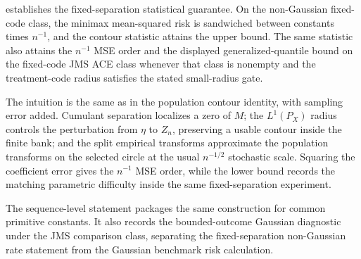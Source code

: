 \documentclass[11pt]{article}
\begin{document}
 establishes the fixed-separation statistical guarantee. On the non-Gaussian fixed-code class, the minimax mean-squared risk is sandwiched between constants times \(n^{-1}\), and the contour statistic attains the upper bound. The same statistic also attains the \(n^{-1}\) MSE order and the displayed generalized-quantile bound on the fixed-code JMS ACE class whenever that class is nonempty and the treatment-code radius satisfies the stated small-radius gate.

The intuition is the same as in the population contour identity, with sampling error added. Cumulant separation localizes a zero of \(M\); the \(L^1(P_X)\) radius controls the perturbation from \(\eta\) to \(Z_n\), preserving a usable contour inside the finite bank; and the split empirical transforms approximate the population transforms on the selected circle at the usual \(n^{-1/2}\) stochastic scale. Squaring the coefficient error gives the \(n^{-1}\) MSE order, while the lower bound records the matching parametric difficulty inside the same fixed-separation experiment.

The sequence-level statement packages the same construction for common primitive constants. It also records the bounded-outcome Gaussian diagnostic under the JMS comparison class, separating the fixed-separation non-Gaussian rate statement from the Gaussian benchmark risk calculation.
\end{document}
